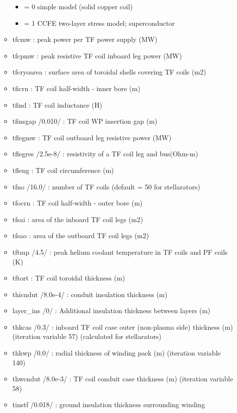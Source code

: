 \documentclass[
]{article}
\providecommand{\tightlist}{%
  \setlength{\itemsep}{0pt}\setlength{\parskip}{0pt}}
\begin{document}
\begin{itemize}
\begin{itemize}
    \begin{itemize}
    \tightlist
    \item
      = 0 simple model (solid copper coil)
    \item
      = 1 CCFE two-layer stress model; superconductor
    \end{itemize}
  \item
    tfcmw : peak power per TF power supply (MW)
  \item
    tfcpmw : peak resistive TF coil inboard leg power (MW)
  \item
    tfcryoarea : surface area of toroidal shells covering TF coils (m2)
  \item
    tficrn : TF coil half-width - inner bore (m)
  \item
    tfind : TF coil inductance (H)
  \item
    tfinsgap /0.010/ : TF coil WP insertion gap (m)
  \item
    tflegmw : TF coil outboard leg resistive power (MW)
  \item
    tflegres /2.5e-8/ : resistivity of a TF coil leg and bus(Ohm-m)
  \item
    tfleng : TF coil circumference (m)
  \item
    tfno /16.0/ : number of TF coils (default = 50 for stellarators)
  \item
    tfocrn : TF coil half-width - outer bore (m)
  \item
    tfsai : area of the inboard TF coil legs (m2)
  \item
    tfsao : area of the outboard TF coil legs (m2)
  \item
    tftmp /4.5/ : peak helium coolant temperature in TF coils and PF
    coils (K)
  \item
    tftort : TF coil toroidal thickness (m)
  \item
    thicndut /8.0e-4/ : conduit insulation thickness (m)
  \item
    layer\_ins /0/ : Additional insulation thickness between layers (m)
  \item
    thkcas /0.3/ : inboard TF coil case outer (non-plasma side)
    thickness (m) (iteration variable 57) (calculated for stellarators)
  \item
    thkwp /0.0/ : radial thickness of winding pack (m) (iteration
    variable 140)
  \item
    thwcndut /8.0e-3/ : TF coil conduit case thickness (m) (iteration
    variable 58)
  \item
    tinstf /0.018/ : ground insulation thickness surrounding winding

\end{itemize}
\end{itemize}
\end{document}
